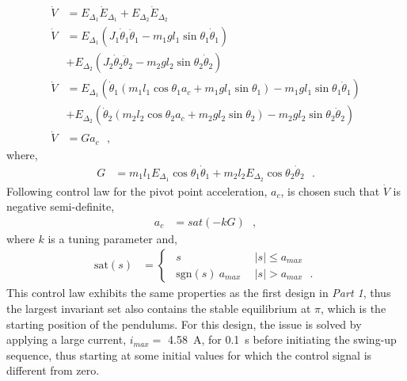 \begin{align}
  \dot{V} &= E_{\Delta_1} \dot{E}_{\Delta_1} + E_{\Delta_2} \dot{E}_{\Delta_2}
  \label{eq:lyapunovDerivativeTwin1} \\ 
  \dot{V} &=
  E_{\Delta_1} ( J_1 \dot{\theta}_1 \ddot{\theta}_1 - m_1 g l_1 \sin \theta_1 \dot{\theta}_1 )  \nonumber \\
  &+
  E_{\Delta_2} ( J_2 \dot{\theta}_2 \ddot{\theta}_2 - m_2 g l_2 \sin \theta_2 \dot{\theta}_2 ) 
  \label{eq:lyapunovDerivativeTwin2} \\
  \dot{V} &= E_{\Delta_1} ( \dot{\theta}_1 ( m_1 l_1 \cos \theta_1 a_c + m_1 g l_1 \sin \theta_1 )  - m_1 g l_1 \sin \theta_1 \dot{\theta}_1 ) \nonumber \\
  &+
  E_{\Delta_2} ( \dot{\theta}_2 ( m_2 l_2 \cos \theta_2 a_c + m_2 g l_2 \sin \theta_2 )  - m_2 g l_2 \sin \theta_2 \dot{\theta}_2 )
  \label{eq:lyapunovDerivativeTwin3} \\
  \dot{V} &= G a_c   \ \ \ ,  \label{eq:lyapunovDerivativeTwin4}
\end{align}
%
where,
\begin{align}
  G &= m_1 l_1 E_{\Delta_1} \cos \theta_1 \dot{\theta}_1 +  m_2 l_2 E_{\Delta_2} \cos \theta_2 \dot{\theta}_2  \ \ \ .  \label{eq:lyapunovDerivativeTwinG}
\end{align}
Following control law for the pivot point acceleration, $a_c$, is chosen such that $\dot{V}$ is negative semi-definite,
\begin{align}
  a_c &= sat( -k G ) \ \ \ ,  \label{eq:twinSwingControl1}
\end{align}
where $k$ is a tuning parameter and,
\begin{align}
  \text{sat}(s) &=
  \begin{cases}
    \ \ s                           & \ \  | s |  \leq a_{max} \\
    \ \ \mathrm{sgn}( s )\ a_{max}  & \ \  | s |  >  a_{max} \ \ \ .
  \end{cases}
  \label{eq:satuationFunctionTwin}
\end{align}
%
This control law exhibits the same properties as the first design in \textit{Part 1}, thus the largest invariant set also contains the stable equilibrium at $\pi$, which is the starting position of the pendulums. For this design, the issue is solved by applying a large current, $i_{max}=$ \SI{4.58}{A}, for \SI{0.1}{s} before initiating the swing-up sequence, thus starting at some initial values for which the control signal is different from zero.\\
